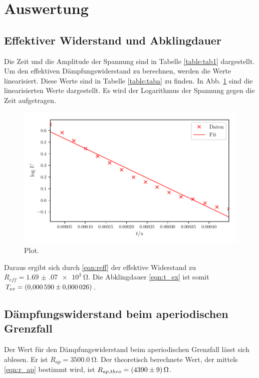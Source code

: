 \section{Auswertung}
\label{sec:Auswertung}

\subsection{Effektiver Widerstand und Abklingdauer} 
Die Zeit und die Amplitude der Spannung sind in Tabelle
\ref{table:tab1} dargestellt. Um den effektiven Dämpfungswiderstand
zu berechnen, werden die Werte linearisiert. Diese Werte sind in
Tabelle \ref{table:taba} zu finden. In Abb. \ref{fig:plota}
sind die linearisierten Werte dargestellt. Es wird der
Logarithmus der Spannung gegen die Zeit aufgetragen.


\begin{figure}
  \centering
  \includegraphics{build/plota.pdf}
  \caption{Plot.}
  \label{fig:plota}
\end{figure}
\noindent Daraus ergibt sich durch \eqref{eqn:reff}%
der effektive Widerstand zu $R_{eff} = \SI{1.69(07)e3}{\ohm}$. %
Die Abklingdauer \ref{eqn:t_ex} ist somit $T_{ex} = \SI{0.000590 \pm 0.000026}{}$. %

\subsection{Dämpfungswiderstand beim aperiodischen Grenzfall}
Der Wert für den Dämpfungswiderstand beim aperiodischen Grenzfall
lässt sich ablesen. Er ist $R_{ap} = \SI{3500.0}{\ohm}$.
\newline
Der theoretisch berechnete Wert, der mittels \eqref{eqn:r_ap}
bestimmt wird, ist $R_{ap,theo} = \SI{4390 \pm 9}{\ohm}$.


